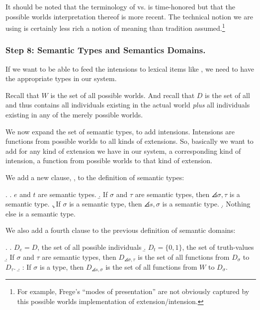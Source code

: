 It %
%
should be noted that the terminology of  vs.
 is time-honored but that the possible worlds
interpretation thereof is more recent. The technical notion we are
using is certainly less rich a notion of meaning than tradition
assumed.\footnote{For example, Frege's ``modes of presentation'' are
  not obviously captured by this possible worlds implementation of
  extension/intension.}

\subsubsection{Step 8: Semantic Types and Semantics Domains.} \label{sec:semantic-types}

If we want to be able to feed the intensions to lexical items like
, we need to have the
appropriate types in our system.

Recall that $W$ is the set of all possible worlds. And recall that $D$
is the set of all  and thus contains all
individuals existing in the actual world \emph{plus} all individuals
existing in any of the merely possible worlds.

We now expand the set of semantic types, to add intensions. Intensions
are functions from possible worlds to all kinds of extensions. So,
basically we want to add for any kind of extension we have in our
system, a corresponding kind of intension, a function from possible
worlds to that kind of extension.

We add a new clause, \Next[c], to the definition of semantic types:

\ex. 
\a. $e$ and $t$ are semantic types.
\b. If $\sigma$ and $\tau$ are semantic types, then $\angles{\sigma,\tau}$ is a semantic type.
\c. If $\sigma$ is a semantic type, then $\angles{s,\sigma}$ is a semantic type.
\d. Nothing else is a semantic type.

We also add a fourth clause to the previous definition of semantic
domains:

\ex.  \a. $D_{e} = D$, the set of all possible individuals \b. $D_{t} = \{0,1\}$, the set of truth-values \b. If $\sigma$ and $\tau$ are semantic types, then $D_{\angles{\sigma,\tau}}$ is the set of all functions from $D_{\sigma}$ to $D_{\tau}$. \b. : If $\sigma$ is a type, then $D_{\angles{s,\sigma}}$ is the set of all functions from $W$ to $D_{\sigma}$.


